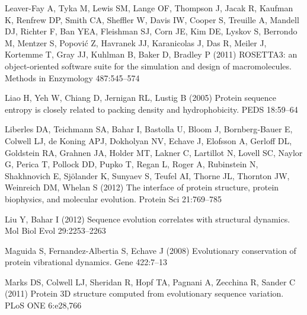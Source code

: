 \documentclass[smallextended]{svjour3}
\begin{document}
\begin{thebibliography}{59}
Leaver-Fay A, Tyka M, Lewis SM, Lange OF, Thompson J, Jacak R, Kaufman K,
  Renfrew DP, Smith CA, Sheffler W, Davis IW, Cooper S, Treuille A, Mandell DJ,
  Richter F, Ban YEA, Fleishman SJ, Corn JE, Kim DE, Lyskov S, Berrondo M,
  Mentzer S, Popovi\'c Z, Havranek JJ, Karanicolas J, Das R, Meiler J, Kortemme
  T, Gray JJ, Kuhlman B, Baker D, Bradley P (2011) {ROSETTA3:} an
  object-oriented software suite for the simulation and design of
  macromolecules. Methods in Enzymology 487:545--574

Liao H, Yeh W, Chiang D, Jernigan RL, Lustig B (2005) Protein sequence entropy
  is closely related to packing density and hydrophobicity. PEDS 18:59--64

Liberles DA, Teichmann SA, Bahar I, Bastolla U, Bloom J, {Bornberg‐Bauer} E,
  Colwell LJ, {de Koning} APJ, Dokholyan NV, Echave J, Elofsson A, Gerloff DL,
  Goldstein RA, Grahnen JA, Holder MT, Lakner C, Lartillot N, Lovell SC, Naylor
  G, Perica T, Pollock DD, Pupko T, Regan L, Roger A, Rubinstein N, Shakhnovich
  E, Sj\"o{}lander K, Sunyaev S, Teufel AI, Thorne JL, Thornton JW, Weinreich
  DM, Whelan S (2012) The interface of protein structure, protein biophysics,
  and molecular evolution. Protein Sci 21:769--785

Liu Y, Bahar I (2012) Sequence evolution correlates with structural dynamics.
  Mol Biol Evol 29:2253--2263

Maguida S, {Fernandez-Albertia} S, Echave J (2008) Evolutionary conservation of
  protein vibrational dynamics. Gene 422:7--13

Marks DS, Colwell LJ, Sheridan R, Hopf TA, Pagnani A, Zecchina R, Sander C
  (2011) Protein {3D} structure computed from evolutionary sequence variation.
  PLoS ONE 6:e28,766


\end{thebibliography}
\end{document}
